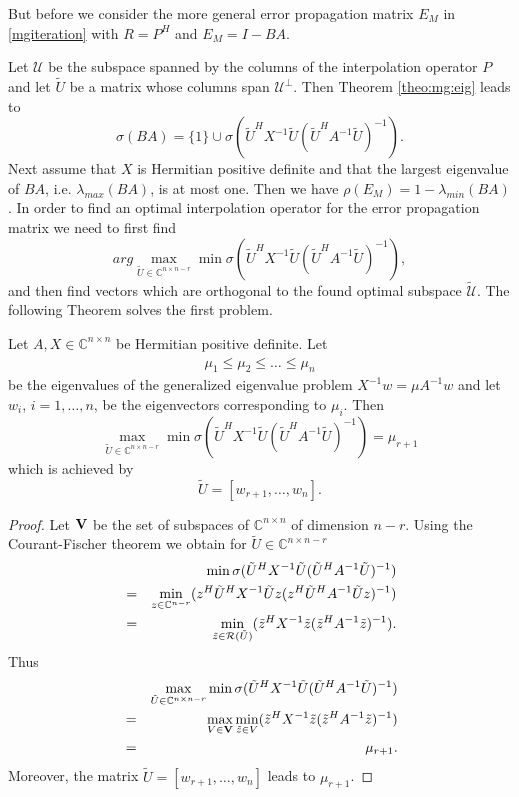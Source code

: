\documentclass[final]{siamltex}
\newcommand{\innCnn}{\in\mathbb{C}^{n\times n}}
\newcommand{\innbCnnmr}{\in\mathbb{C}^{n\times n-r}}
\newcommand{\innCnmr}{\in\mathbb{C}^{n-r}}
\newcommand{\U}{\mathcal{U}}
\newcommand{\beqo}{\begin{eqnarray*}}
\newcommand{\beq}{\begin{eqnarray}}
\newcommand{\eeqo}{\end{eqnarray*}}
\newcommand{\eeq}{\end{eqnarray}}
\numberwithin{equation}{section}
\newcommand{\ran} {{\cal R}}
\newcommand{\Cnn}{\mathbb{C}^{n \times n}}
\begin{document}
But before  we consider  the  more general error propagation matrix $E_M$ in \eqref{mgiteration} with $R= P^H$  and  $E_{M} = I - BA$.



Let $\U $ be the subspace spanned  by the columns of the interpolation operator $P$ and let $\tilde U$ be a matrix whose  columns span  $\U ^\perp$. Then  Theorem \ref{theo:mg:eig}  leads to 
\[
\sigma (BA) = \{1\} \cup \sigma(\tilde U^HX^{-1}\tilde U (\tilde U^HA^{-1}\tilde U)^{-1}). 
\]
Next assume that $X$ is Hermitian positive definite and that the largest eigenvalue of $BA$, i.e. $\lambda_{max}(BA)$,  is at most one. Then we have $\rho(E_M) = 1 - \lambda_{min}(BA)$. In order to find an optimal interpolation operator for the error propagation matrix  we need  to first find
\[
arg \max_{\tilde U \innbCnnmr} \min \sigma(\tilde U^HX^{-1}\tilde U (\tilde U^HA^{-1}\tilde U)^{-1}),
\]
and then find vectors which are orthogonal to the found optimal subspace $\mathcal{\tilde U}$.
The following Theorem  solves the   first  problem.

\begin{theorem} \label{theo:main}
Let $A, X \innCnn$ be Hermitian positive definite. Let 
\beq
\mu_1 \leq \mu_2 \leq \ldots \leq  \mu_n 
\eeq
be the  eigenvalues of the generalized eigenvalue problem $X^{-1}w = \mu A^{-1}w$ and let $w_i$, $i = 1, \ldots, n$, be the eigenvectors corresponding to $\mu_i$. Then 
\[
\max_{\tilde U \innbCnnmr} \min \sigma(\tilde U^HX^{-1}\tilde U (\tilde U^HA^{-1}\tilde U)^{-1}) = \mu_{r+1}
\]
which is achieved by 
\[
\tilde U = [w_{r+1}, \ldots, w_n].
\] 
\end{theorem}
\begin{proof}
Let ${\bf V}$ be the set of subspaces of $\Cnn$ of dimension $n-r$. Using the Courant-Fischer theorem we obtain for $\tilde U \innbCnnmr$
\beqo
& &  \min \sigma(\tilde U^HX^{-1}\tilde U (\tilde U^HA^{-1}\tilde U)^{-1})\\
& = &  \min_{z \innCnmr} (z^H\tilde U^HX^{-1}\tilde Uz (z^H\tilde U^HA^{-1}\tilde Uz)^{-1})\\
 & = &  \min_{\tilde z \in {\ran (\tilde U)} } (\tilde z^HX^{-1}\tilde z (\tilde z^HA^{-1}\tilde z)^{-1}).
\eeqo
Thus
\beqo
& &  \max_{\tilde U \innbCnnmr} \min \sigma(\tilde U^HX^{-1}\tilde U (\tilde U^HA^{-1}\tilde U)^{-1})\\
& = & \max_{V  \in {\bf V}} \min_{\tilde z \in V} (\tilde z^HX^{-1}\tilde z (\tilde z^HA^{-1}\tilde z)^{-1})\\
&  = & \mu_{r+1}.
\eeqo
Moreover, the matrix $\tilde U = [w_{r+1}, \ldots, w_n]$ leads  to $\mu_{r+1}$.
\end{proof}
\end{document}
